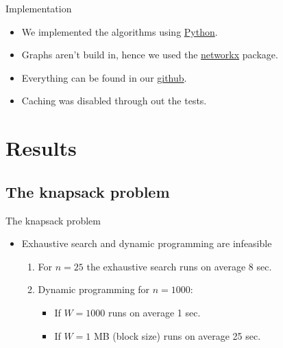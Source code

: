 \documentclass{beamer}
\begin{document}
\begin{frame}{Implementation}
    \begin{itemize}
        \item {We implemented the algorithms using 
        \href{https://www.python.org/}{Python}.}
        \item {Graphs aren't build in, hence we used the 
        \href{https://networkx.github.io/}{networkx} package.}
        \item {Everything can be found in our 
        \href{https://besartdollma.github.io/Increasing-profit-from-fees-of-cryptocurrencies/}{github}.}
        \item {Caching was disabled through out the tests.}
    \end{itemize}
\end{frame}

\section{Results}
\subsection*{The knapsack problem}
\begin{frame}{The knapsack problem}{}  %
    \begin{itemize}
        \item{Exhaustive search and dynamic programming are infeasible}
            \begin{enumerate}
                \item {For $n=25$ the exhaustive search runs on average 8 sec.}
                \item {Dynamic programming for $n=1000$:}
                \begin{itemize}
                    \item {If $W=1000$ runs on average 1 sec.}
                    \item {If $W = 1 $ MB (block size) runs on average 25 sec.}
                \end{itemize}
            \end{enumerate}
    \end{itemize}
\end{frame}
\end{document}
